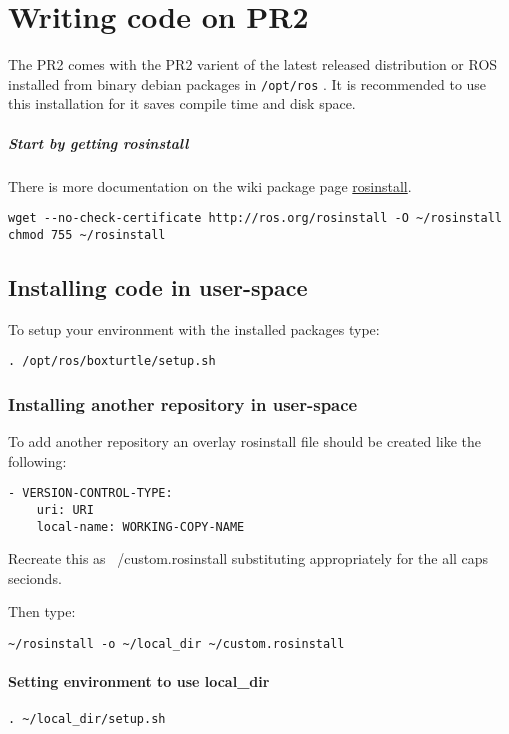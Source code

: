 \chapter{Writing code on PR2}
The PR2 comes with the PR2 varient of the latest released distribution
or ROS installed from binary debian packages in \texttt{/opt/ros} .  It is
recommended to use this installation for it saves compile time and
disk space.

\paragraph{Start by getting rosinstall}
There is more documentation on the wiki package page
\href{http://www.ros.org/wiki/rosinstall}{rosinstall}.

\begin{verbatim}
wget --no-check-certificate http://ros.org/rosinstall -O ~/rosinstall
chmod 755 ~/rosinstall
\end{verbatim}

\section{Installing code in user-space}
To setup your environment with the installed packages type:
\begin{verbatim}
. /opt/ros/boxturtle/setup.sh
\end{verbatim}
\subsection{Installing another repository in user-space}
To add another repository an overlay rosinstall file should be created
like the following:
\begin{verbatim}
- VERSION-CONTROL-TYPE:
    uri: URI
    local-name: WORKING-COPY-NAME
\end{verbatim}
Recreate this as ~/custom.rosinstall substituting appropriately for the all caps secionds. 

Then type:
\begin{verbatim}
~/rosinstall -o ~/local_dir ~/custom.rosinstall
\end{verbatim}
\subsubsection{Setting environment to use local\_dir}
\begin{verbatim}
. ~/local_dir/setup.sh
\end{verbatim}


